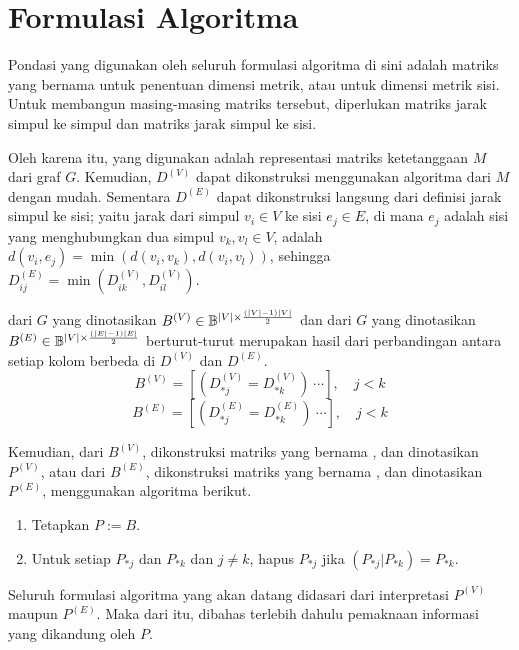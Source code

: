 \section{Formulasi Algoritma}
\label{sec:alg}

Pondasi yang digunakan oleh seluruh formulasi algoritma di sini adalah matriks yang bernama  untuk penentuan dimensi metrik, atau  untuk dimensi metrik sisi. Untuk membangun masing-masing matriks tersebut, diperlukan matriks jarak simpul ke simpul dan matriks jarak simpul ke sisi.

Oleh karena itu,  yang digunakan adalah representasi matriks ketetanggaan \(M\) dari graf \(G\). Kemudian, \(D^{(V)}\) dapat dikonstruksi menggunakan algoritma  \citep{floyd1962, warshall1962} dari \(M\) dengan mudah. Sementara \(D^{(E)}\) dapat dikonstruksi langsung dari definisi jarak simpul ke sisi; yaitu jarak dari simpul \(v_i \in V\) ke sisi \(e_j \in E\), di mana \(e_j\) adalah sisi yang menghubungkan dua simpul \(v_k, v_l \in V\), adalah \(d(v_i,e_j) = \min(d(v_i, v_k), d(v_i, v_l))\), sehingga \(D^{(E)}_{ij} = \min(D^{(V)}_{ik}, D^{(V)}_{il})\).

 dari \(G\) yang dinotasikan \(B^{(V)} \in \Bbb^{|V|\times \frac{(|V|-1)|V|}{2}}\) dan  dari \(G\) yang dinotasikan \(B^{(E)} \in \Bbb^{|V|\times \frac{(|E|-1)|E|}{2}}\) berturut-turut merupakan hasil dari perbandingan antara setiap kolom berbeda di \(D^{(V)}\) dan \(D^{(E)}\).
	\[ B^{(V)} = [(D^{(V)}_{*j} = D^{(V)}_{*k})\ \cdots], \quad j < k\]
	\[ B^{(E)} = [(D^{(E)}_{*j} = D^{(E)}_{*k})\ \cdots], \quad j < k\]

Kemudian, dari \(B^{(V)}\), dikonstruksi matriks yang bernama , dan dinotasikan \(P^{(V)}\), atau dari \(B^{(E)}\), dikonstruksi matriks yang bernama , dan dinotasikan \(P^{(E)}\), menggunakan algoritma berikut.
\begin{enumerate}
	\item Tetapkan \(P := B\).
	\item Untuk setiap \(P_{*j}\) dan \(P_{*k}\) dan \(j \neq k\), hapus \(P_{*j}\) jika \((P_{*j} | P_{*k}) = P_{*k}\).
\end{enumerate}

Seluruh formulasi algoritma yang akan datang didasari dari interpretasi \(P^{(V)}\) maupun \(P^{(E)}\). Maka dari itu, dibahas terlebih dahulu pemaknaan informasi yang dikandung oleh \(P\).

